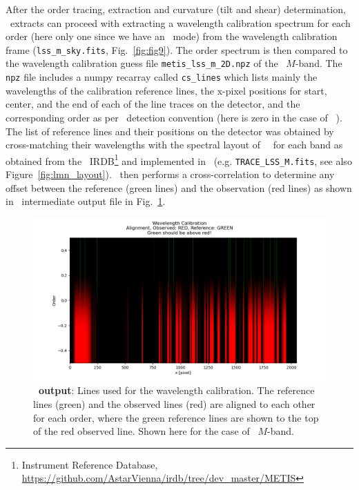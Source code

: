 After the order tracing, extraction and curvature (tilt and shear) determination, \pyred~extracts can proceed with extracting a wavelength calibration spectrum for each order (here only one since we have an \lss~mode) from the wavelength calibration frame (\texttt{lss\_m\_sky.fits}, Fig.~\ref{fig:fig9}). The order spectrum is then compared to the wavelength calibration guess file \texttt{metis\_lss\_m\_2D.npz} of the \lss~$M$-band.  The \texttt{npz} file includes a numpy recarray called \texttt{cs\_lines} which lists mainly the wavelengths of the calibration reference lines, the x-pixel positions for start, center, and the end of each of the line traces on the detector, and the corresponding order as per \pyred~detection convention (here is zero in the case of \met~\lss). The list of reference lines and their positions on the detector was obtained by cross-matching their wavelengths  with the spectral layout of \met~\lss~for each band as obtained from the \met~IRDB\footnote{Instrument Reference Database, \url{https://github.com/AstarVienna/irdb/tree/dev_master/METIS}} and implemented in \scope~(e.g. \texttt{TRACE\_LSS\_M.fits}, see also Figure~\ref{fig:lmn_layout}). \pyred~then performs a cross-correlation to determine any offset between the reference (green lines) and the observation (red lines) as shown in \pyred~intermediate output file in Fig.~\ref{fig:fig10}.
\begin{figure}[!ht]
  \centering
  \includegraphics[width=\textwidth]{figures/LSS_CrtAlg_files/Figure_13.png}
  \caption{\textbf{\pyred~output}: Lines used for the wavelength calibration. The reference lines (green) and the observed lines (red) are aligned to each other for each order, where the green reference lines are shown to the top of the red observed line.  Shown here for the case of \lss~$M$-band.}
  \label{fig:fig10}
\end{figure}


